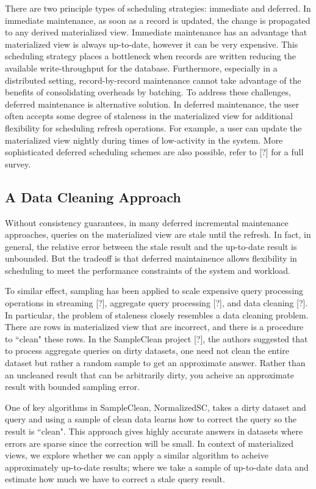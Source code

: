 There are two principle types of scheduling strategies: immediate and deferred. 
In immediate maintenance, as soon as a record is updated, 
the change is propagated to any derived materialized view.
Immediate maintenance has an advantage that materialized view is always up-to-date, 
however it can be very expensive.
This scheduling strategy places a bottleneck when records are written reducing 
the available write-throughput for the database.
Furthermore, especially in a distributed setting, record-by-record 
maintenance cannot take advantage of the benefits of consolidating overheads by batching.
To address these challenges, deferred maintenance is alternative solution.
In deferred maintenance, the user often accepts some degree of staleness in 
the materialized view for additional flexibility for scheduling refresh operations.
For example, a user can update the materialized view 
nightly during times of low-activity in the system.
More sophisticated deferred scheduling schemes are also possible, refer to [?] for a full survey.

\subsection{A Data Cleaning Approach}
Without consistency guarantees, in many deferred incremental maintenance approaches, 
queries on the materialized view are stale until the refresh.
In fact, in general, the relative error between the stale result and the up-to-date result is unbounded.
But the tradeoff is that deferred maintainence allows flexibility in scheduling to meet the performance constraints
of the system and workload.

To similar effect, sampling has been applied to scale expensive query processing operations in streaming [?], 
aggregate query processing [?], and data cleaning [?].
In particular, the problem of staleness closely resembles a data cleaning problem.
There are rows in materialized view that are incorrect, and there is a procedure to ``clean" these rows.
In the SampleClean project [?], the authors suggested that to process aggregate queries on dirty datasets, 
one need not clean the entire dataset but rather a random sample to get an approximate answer.
Rather than an uncleaned result that can be arbitrarily dirty, you acheive an approximate result with bounded sampling error. 

One of key algorithms in SampleClean, NormalizedSC, takes a dirty dataset and query and using a sample of clean data learns how
to correct the query so the result is ``clean".
This approach gives highly accurate answers in datasets where errors are sparse since the correction will be small.
In context of materialized views, we explore whether we can apply a similar algorithm to acheive approximately up-to-date results;
where we take a sample of up-to-date data and estimate how much we have to correct a stale query result.

